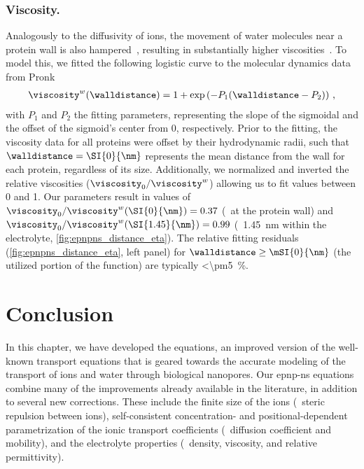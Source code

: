 \subsubsection{Viscosity.}
%
Analogously to the diffusivity of ions, the movement of water molecules near a protein wall is also
hampered~\cite{Makarov-1998}, resulting in substantially higher viscosities~\cite{Pronk-2014}. To model this,
we fitted the following logistic curve to the molecular dynamics data from Pronk \etal{}~\cite{Pronk-2014}
%
\begin{align}\label{eq:epnpns_distance_eta}
  \viscosity^w (\walldistance) = 1 + \exp{ \left( -P_1 (\walldistance - P_2) \right) }
  \text{ ,}
\end{align}
%
with $P_1$ and $P_2$ the fitting parameters, representing the slope of the sigmoidal and the offset of the
sigmoid's center from 0, respectively. Prior to the fitting, the viscosity data for all proteins were offset
by their hydrodynamic radii, such that $\walldistance = \SI{0}{\nm}$ represents the mean distance from the
wall for each protein, regardless of its size. Additionally, we normalized and inverted the relative
viscosities ($\viscosity_0 / \viscosity^w$) allowing us to fit values between 0 and 1. Our parameters result
in values of $\viscosity_0 / \viscosity^w (\SI{0}{\nm}) = 0.37$ (\ie~at the protein wall) and $\viscosity_0
/ \viscosity^w (\SI{1.45}{\nm}) = 0.99$ (\ie~\SI{1.45}{\nm} within the electrolyte,
\cref{fig:epnpns_distance_eta}). The relative fitting residuals (\cref{fig:epnpns_distance_eta}, left panel)
for $\walldistance \ge \mSI{0}{\nm}$ (the utilized portion of the function) are typically
\SI{<\pm5}{\percent}.





\section{Conclusion}
%
\label{sec:epnp-ns:conclusion}
%

In this chapter, we have developed the  equations, an improved version of the well-known
transport equations that is geared towards the accurate modeling of the transport of ions and water through
biological nanopores. Our \gls{epnp-ns} equations combine many of the improvements already available in the
literature, in addition to several new corrections. These include the finite size of the ions (\ie~steric
repulsion between ions), self-consistent concentration- and positional-dependent parametrization of the ionic
transport coefficients (\ie~diffusion coefficient and mobility), and the electrolyte properties
(\ie~density, viscosity, and relative permittivity).

